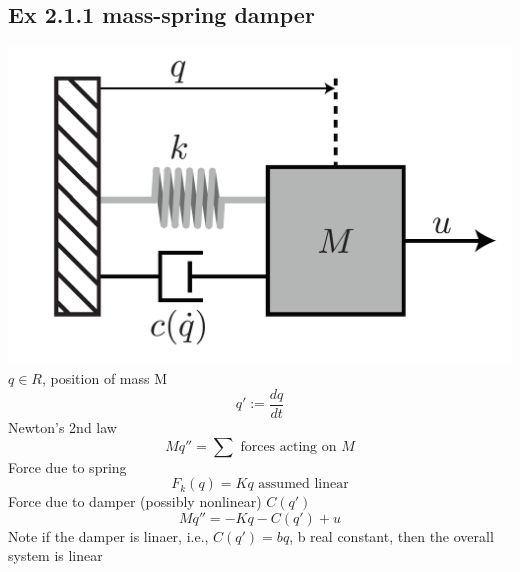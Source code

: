 \documentclass[12pt, a4paper]{article}
\begin{document}

\subsection*{Ex 2.1.1 mass-spring damper}
\includegraphics[scale=0.5]{images/EX2_1_1.png}
$q\in R$, position of mass M
$$q':=\frac{dq}{dt}$$
Newton's 2nd law $$Mq''=\sum \text{ forces acting on } M$$
Force due to spring $$F_k(q)=Kq \text{ assumed linear}$$
Force due to damper (possibly nonlinear) $C(q')$
$$Mq''=-Kq-C(q')+u$$
Note if the damper is linaer, i.e., $C(q')=bq$, b real constant, then the overall system is linear
\end{document}
